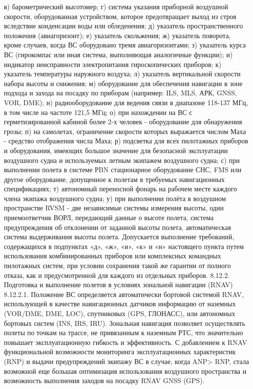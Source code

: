 в)	барометрический высотомер;
г)	система указания приборной воздушной скорости, оборудованная устройством, которое предотвращает выход из строя вследствие конденсации воды или обледенения;
д)	указатель пространственного положения (авиагоризонт);
е)	указатель скольжения;
ж)	указатель поворота, кроме случаев, когда ВС оборудовано тремя авиагоризонтами;
з)	указатель курса ВС (гирокомпас или иная система, выполняющая аналогичные функции);
и)	индикатор неисправности электропитания гироскопических приборов;
к)	указатель температуры наружного воздуха;
л)	указатель вертикальной скорости набора высоты и снижения;
м)	оборудование для обеспечения навигации в зоне подхода и захода на посадку по приборам (например: ILS, MLS, АРК, GNSS, VOR, DME);
н)	радиооборудование для ведения связи в диапазоне 118-137 МГц, в том числе на частоте 121,5 МГц;
о)	при нахождении на ВС с герметизированной кабиной более 2-х человек - оборудование для обнаружения грозы;
п)	на самолетах, ограничение скорости которых выражается числом Маха - средство отображения числа Маха; 
р)	подсветка для всех пилотажных приборов и оборудования, имеющих большое значение для безопасной
эксплуатации воздушного судна и используемых летным экипажем воздушного судна;
с)	при выполнении полета в системе РBN стационарное оборудование СНС, FMS или другое оборудование, допущенное к полетам в требуемых навигационных спецификациях;
т)	автономный переносной фонарь на рабочем месте каждого члена экипажа воздушного судна;
у)	при выполнении полёта в воздушном пространстве RVSM - две независимые системы измерения высоты, один приемоответчик ВОРЛ, передающий данные о высоте полета, система предупреждения об отклонении от заданной высоты полета, автоматическая система выдерживания высоты полета.
Допускается выполнение требований, содержащихся в подпунктах «д», «ж», «и», «к» и «н» настоящего пункта путем использования комбинированных приборов или комплексных командных пилотажных систем, при условии сохранения такой же гарантии от полного отказа, как и предусмотренной для каждого из отдельных приборов.
8.12.2.	Подготовка и выполнение полетов в условиях зональной навигации (RNAV)
8.12.2.1. Положение ВС определяется автоматически бортовой системой RNAV, использующей в качестве навигационных датчиков информацию от наземных (VOR/DME, DME, LOC), спутниковых (GPS, ГЛОНАСС), или автономных бортовых систем (INS, IRS, IRU). Зональная навигация позволяет осуществлять полеты по точкам на трассе, не привязанным к наземным РТС, что значительно повышает эксплуатационную гибкость и эффективность.
С добавлением к RNAV функциональной возможности мониторинга эксплуатационных характеристик (RNP) и выдачи предупреждений экипажу ВС в случае, когда ANP> RNP, стала возможной еще большая оптимизация использования воздушного пространства и возможность выполнения заходов на посадку RNAV GNSS (GPS).
